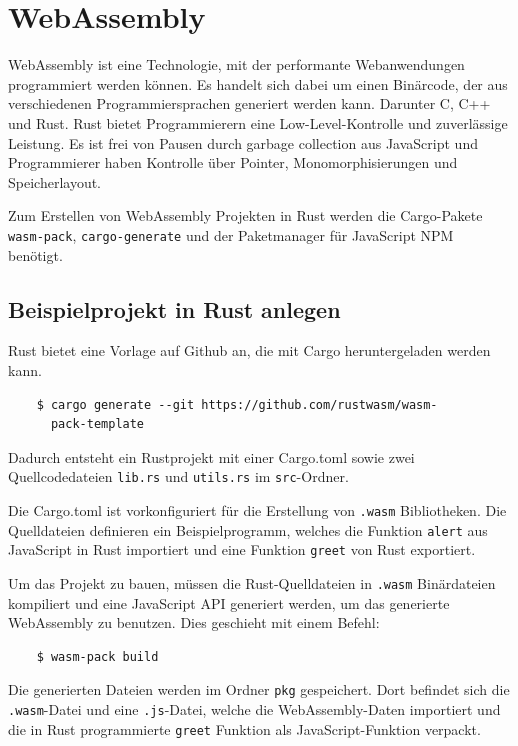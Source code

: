 \section{WebAssembly}

WebAssembly ist eine Technologie, mit der performante Webanwendungen programmiert werden können. Es handelt sich dabei um einen Binärcode, der aus verschiedenen Programmiersprachen generiert werden kann. Darunter C, C++ und Rust. Rust bietet Programmierern eine Low-Level-Kontrolle und zuverlässige Leistung. Es ist frei von Pausen durch garbage collection aus JavaScript und Programmierer haben Kontrolle über Pointer, Monomorphisierungen und Speicherlayout.

Zum Erstellen von WebAssembly Projekten in Rust werden die Cargo-Pakete \verb"wasm-pack", \verb"cargo-generate" und der Paketmanager für JavaScript NPM benötigt. \cite{RustWebAssembly}

\subsection{Beispielprojekt in Rust anlegen}

Rust bietet eine Vorlage auf Github an, die mit Cargo heruntergeladen werden kann.

\begin{lstlisting}
    $ cargo generate --git https://github.com/rustwasm/wasm-
      pack-template
\end{lstlisting}

Dadurch entsteht ein Rustprojekt mit einer Cargo.toml sowie zwei Quellcodedateien \verb"lib.rs" und \verb"utils.rs" im \verb"src"-Ordner.

Die Cargo.toml ist vorkonfiguriert für die Erstellung von \verb".wasm" Bibliotheken. Die Quelldateien definieren ein Beispielprogramm, welches die Funktion \verb"alert" aus JavaScript in Rust importiert und eine Funktion \verb"greet" von Rust exportiert.

Um das Projekt zu bauen, müssen die Rust-Quelldateien in \verb".wasm" Binärdateien kompiliert und eine JavaScript API generiert werden, um das generierte WebAssembly zu benutzen. Dies geschieht mit einem Befehl:

\begin{lstlisting}
    $ wasm-pack build
\end{lstlisting}

Die generierten Dateien werden im Ordner \verb"pkg" gespeichert. Dort befindet sich die \verb".wasm"-Datei und eine \verb".js"-Datei, welche die WebAssembly-Daten importiert und die in Rust programmierte \verb"greet" Funktion als JavaScript-Funktion verpackt.

